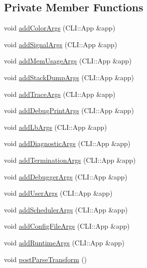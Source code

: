 \subsection*{Private Member Functions}
\begin{DoxyCompactItemize}
\item 
void \hyperlink{structvt_1_1arguments_1_1_arg_config_a88f975427c3408ac8ada2add79fb9692}{add\+Color\+Args} (C\+L\+I\+::\+App \&app)
\item 
void \hyperlink{structvt_1_1arguments_1_1_arg_config_ac8c405111103fc7bef367cce277235d4}{add\+Signal\+Args} (C\+L\+I\+::\+App \&app)
\item 
void \hyperlink{structvt_1_1arguments_1_1_arg_config_aef7cb73c09dd2f554a550c2ab54b66f0}{add\+Mem\+Usage\+Args} (C\+L\+I\+::\+App \&app)
\item 
void \hyperlink{structvt_1_1arguments_1_1_arg_config_a0606d4951d3320d9489e65fccc1ab98b}{add\+Stack\+Dump\+Args} (C\+L\+I\+::\+App \&app)
\item 
void \hyperlink{structvt_1_1arguments_1_1_arg_config_ab3de7d531bd7f09c7ea1b37c9e57a02f}{add\+Trace\+Args} (C\+L\+I\+::\+App \&app)
\item 
void \hyperlink{structvt_1_1arguments_1_1_arg_config_afbe3ad33df89d6f702afa1b6e402e9a8}{add\+Debug\+Print\+Args} (C\+L\+I\+::\+App \&app)
\item 
void \hyperlink{structvt_1_1arguments_1_1_arg_config_a4e1787f38e5ed8f4732b9e27011abd24}{add\+Lb\+Args} (C\+L\+I\+::\+App \&app)
\item 
void \hyperlink{structvt_1_1arguments_1_1_arg_config_a8783b70093b5fb9cae74e97b2c428c44}{add\+Diagnostic\+Args} (C\+L\+I\+::\+App \&app)
\item 
void \hyperlink{structvt_1_1arguments_1_1_arg_config_a0504992629228af199a906edc43b4d0a}{add\+Termination\+Args} (C\+L\+I\+::\+App \&app)
\item 
void \hyperlink{structvt_1_1arguments_1_1_arg_config_ad1c8bc76bc17ffd3245331c5cab90f0c}{add\+Debugger\+Args} (C\+L\+I\+::\+App \&app)
\item 
void \hyperlink{structvt_1_1arguments_1_1_arg_config_aa578460e6783d03ce25e349f8affea99}{add\+User\+Args} (C\+L\+I\+::\+App \&app)
\item 
void \hyperlink{structvt_1_1arguments_1_1_arg_config_ad41d94608d841c18dd302c80ed10c52d}{add\+Scheduler\+Args} (C\+L\+I\+::\+App \&app)
\item 
void \hyperlink{structvt_1_1arguments_1_1_arg_config_a05ce6db9c65585991e2e6e2d741b9dc7}{add\+Config\+File\+Args} (C\+L\+I\+::\+App \&app)
\item 
void \hyperlink{structvt_1_1arguments_1_1_arg_config_a7d5026013c8a56d2684270b0bda83c2b}{add\+Runtime\+Args} (C\+L\+I\+::\+App \&app)
\item 
void \hyperlink{structvt_1_1arguments_1_1_arg_config_a688dc6a1e88d8544e2ab41b4db15d8cd}{post\+Parse\+Transform} ()
\end{DoxyCompactItemize}
